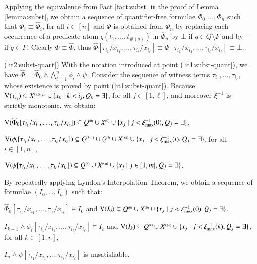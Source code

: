 Applying the equivalence from Fact \ref{fact:subst} in the proof of
Lemma \ref{lemma:subst}, we obtain a sequence of quantifier-free
formulae $\overline{\Phi}_0, \ldots, \overline{\Phi}_n$ such that
$\overline{\Phi}_i \equiv \widehat{\Phi}_i$, for all $i \in [n]$ and
$\overline{\Phi}$ is obtained from $\overline{\Phi}_n$ by replacing
each occurrence of a predicate atom $q(t_1,\ldots,t_{\#(q)})$ in
$\overline{\Phi}_n$ by $\bot$ if $q \in Q\setminus F$ and by $\top$ if
$q \in F$. Clearly $\overline{\Phi} \equiv \widehat{\Phi}$, thus
$\widehat{\Phi}[\tau_{i_1}/x_{i_1}, \ldots, \tau_{i_\ell}/x_{i_\ell}]
\equiv \overline{\Phi}[\tau_{i_1}/x_{i_1}, \ldots,
  \tau_{i_\ell}/x_{i_\ell}] \equiv \bot$.

\noindent(\ref{it2:subst-quant}) With the notation introduced at point
(\ref{it1:subst-quant}), we have $\widehat{\Phi} = \widehat{\Phi}_0
\wedge \bigwedge_{i=1}^n \phi_i \wedge \psi$. Consider the sequence of
witness terms $\tau_{i_1}, \ldots, \tau_{i_\ell}$, whose existence is
proved by point (\ref{it1:subst-quant}). Because $\mathrm{V}({\tau_{i_j}})
\subseteq {X}^{\scriptscriptstyle{({\leq \xi(i_j)})}} \cup \{ x_k \mid k < i_j, Q_k =
  \exists \}$, for all $j \in [1,\ell]$, and moreover $\xi^{-1}$ is
strictly monotonic, we obtain: \begin{compactitem}
\item $\mathrm{V}({\widehat{\Phi}_0[\tau_{i_1}/x_{i_1}, \ldots,
    \tau_{i_\ell}/x_{i_\ell}]}) \subseteq {Q}^{\scriptscriptstyle{({0})}} \cup
  {X}^{\scriptscriptstyle{({0})}} \cup \{ x_j \mid j < \xi_{\max}^{-1}(0), Q_j = \exists \}$,
\item $\mathrm{V}({\phi_i[\tau_{i_1}/x_{i_1}, \ldots,
    \tau_{i_\ell}/x_{i_\ell}]}) \subseteq {Q}^{\scriptscriptstyle{({i-1})}} \cup
  {Q}^{\scriptscriptstyle{({i})}} \cup {X}^{\scriptscriptstyle{({\leq i})}} \cup \{ x_j \mid j <
    \xi_{\max}^{-1}(i), Q_j = \exists \}$, for all $i \in [1,n]$,
\item $\mathrm{V}({\psi[\tau_{i_1}/x_{i_1}, \ldots,
    \tau_{i_\ell}/x_{i_\ell}]}) \subseteq {Q}^{\scriptscriptstyle{({n})}} \cup
  {X}^{\scriptscriptstyle{({\leq n})}} \cup \{ x_j \mid j \in [1,m], Q_j = \exists \}$.
\end{compactitem}
By repeatedly applying Lyndon's Interpolation Theorem, we obtain a
sequence of formulae $(I_0, \ldots, I_n)$ such
that: \begin{compactitem}
\item $\widehat{\Phi}_0[\tau_{i_1}/x_{i_1}, \ldots,
  \tau_{i_\ell}/x_{i_\ell}] \models I_0$ and $\mathrm{V}({I_0}) \subseteq
  {Q}^{\scriptscriptstyle{({0})}} \cup {X}^{\scriptscriptstyle{({0})}} \cup \{ x_j \mid j <
    \xi_{\max}^{-1}(0), Q_j = \exists \}$,
\item $I_{k-1} \wedge \phi_i[\tau_{i_1}/x_{i_1}, \ldots,
  \tau_{i_\ell}/x_{i_\ell}] \models I_k$ and $\mathrm{V}({I_k}) \subseteq
  {Q}^{\scriptscriptstyle{({k})}} \cup {X}^{\scriptscriptstyle{({\leq k})}} \cup \{ x_j \mid j <
    \xi_{\max}^{-1}(k), Q_j = \exists \}$, for all $k \in [1,n]$,
\item $I_n \wedge \psi[\tau_{i_1}/x_{i_1}, \ldots,
  \tau_{i_\ell}/x_{i_\ell}]$ is unsatisfiable.
\end{compactitem}
